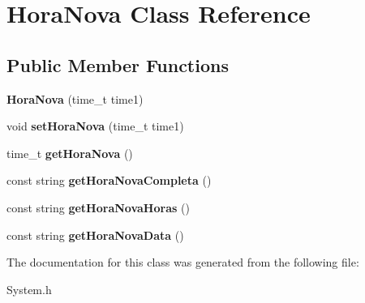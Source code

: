 \hypertarget{class_hora_nova}{}\section{Hora\+Nova Class Reference}
\label{class_hora_nova}
\subsection*{Public Member Functions}
\begin{DoxyCompactItemize}
\item 
\hypertarget{class_hora_nova_ab82cb8096c2e5c244206378f304e88be}{}{\bfseries Hora\+Nova} (time\+\_\+t time1)\label{class_hora_nova_ab82cb8096c2e5c244206378f304e88be}

\item 
\hypertarget{class_hora_nova_adef600287f7aa3001ee40be141a5810b}{}void {\bfseries set\+Hora\+Nova} (time\+\_\+t time1)\label{class_hora_nova_adef600287f7aa3001ee40be141a5810b}

\item 
\hypertarget{class_hora_nova_a3d613dbe2b24e2c8c02571ff24c983a8}{}time\+\_\+t {\bfseries get\+Hora\+Nova} ()\label{class_hora_nova_a3d613dbe2b24e2c8c02571ff24c983a8}

\item 
\hypertarget{class_hora_nova_adb109871ead648de0f79b479bf89a64b}{}const string {\bfseries get\+Hora\+Nova\+Completa} ()\label{class_hora_nova_adb109871ead648de0f79b479bf89a64b}

\item 
\hypertarget{class_hora_nova_a20518cf8e04847c487634d36a76ba455}{}const string {\bfseries get\+Hora\+Nova\+Horas} ()\label{class_hora_nova_a20518cf8e04847c487634d36a76ba455}

\item 
\hypertarget{class_hora_nova_a40043280cc8a4f8f301542ccaaa22578}{}const string {\bfseries get\+Hora\+Nova\+Data} ()\label{class_hora_nova_a40043280cc8a4f8f301542ccaaa22578}

\end{DoxyCompactItemize}


The documentation for this class was generated from the following file\+:\begin{DoxyCompactItemize}
\item 
System.\+h\end{DoxyCompactItemize}
